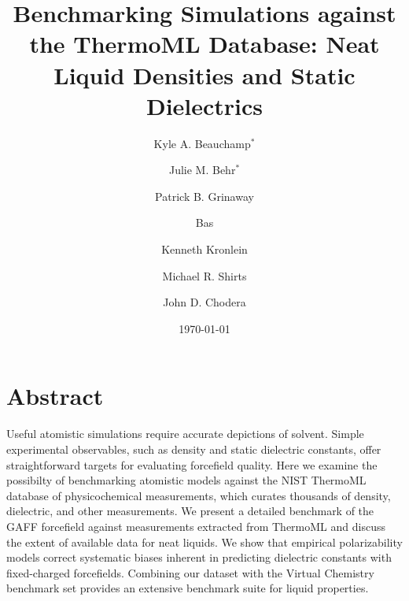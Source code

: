 \documentclass[aps,pre,twocolumn,superscriptaddress]{revtex4-1}
\begin{document}
\title{Benchmarking Simulations against the ThermoML Database: Neat Liquid Densities and Static Dielectrics}

 \author{Kyle A. Beauchamp$^*$}

 \author{Julie M. Behr$^*$}

\author{Patrick B. Grinaway }

\author{Bas}

 \author{Kenneth Kronlein}
 
 \author{Michael R. Shirts}

 \author{John D. Chodera}

 
\date{\today}
\maketitle


\section{Abstract}

Useful atomistic simulations require accurate depictions of solvent.  Simple experimental observables, such as density and static dielectric constants, offer straightforward targets for evaluating forcefield quality.  Here we examine the possibilty of benchmarking atomistic models against the NIST ThermoML database of physicochemical measurements, which curates thousands of density, dielectric, and other measurements.  We present a detailed benchmark of the GAFF forcefield against measurements extracted from ThermoML and discuss the extent of available data for neat liquids.  We show that empirical polarizability models correct systematic biases inherent in predicting dielectric constants with fixed-charged forcefields.  Combining our dataset with the Virtual Chemistry benchmark set provides an extensive benchmark suite for liquid properties.  
\end{document}
